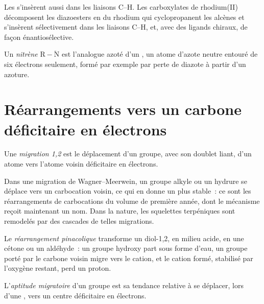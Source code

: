 Les  s'insèrent aussi dans les liaisons C--H. Les
carboxylates de rhodium(II) décomposent les diazoesters en  du
rhodium qui cyclopropanent les alcènes et s'insèrent sélectivement dans les
liaisons C--H, et, avec des ligands chiraux, de façon énantiosélective.

\begin{definition}[Nitrènes]\label{def:b3:radicals-carbenes:nitrene}
Un \emph{nitrène} $\mathrm{R{-}\ddot N}$ est l'analogue azoté d'un , un atome
d'azote neutre entouré de six électrons seulement, formé par exemple par
perte de diazote à partir d'un azoture.
\end{definition}

\section{Réarrangements vers un carbone déficitaire en électrons}

\begin{definition}[Migration 1,2]\label{def:b3:radicals-carbenes:shift}
Une \emph{migration 1,2} est le déplacement d'un
groupe, avec son doublet liant, d'un atome vers l'atome voisin déficitaire
en électrons.
\end{definition}

Dans une migration de Wagner--Meerwein, un groupe alkyle ou un hydrure se
déplace vers un carbocation voisin, ce qui en donne un plus stable~: ce sont
les réarrangements de carbocations du volume de première année, dont le
mécanisme reçoit maintenant un nom. Dans la nature, les squelettes
terpéniques sont remodelés par des cascades de telles migrations.

\begin{definition}\label{def:b3:radicals-carbenes:pinacol}
Le \emph{réarrangement pinacolique} transforme un
diol-1,2, en milieu acide, en une cétone ou un aldéhyde~: un groupe hydroxy
part sous forme d'eau, un groupe porté par le carbone voisin migre vers le
cation, et le cation formé, stabilisé par l'oxygène restant, perd un
proton.
\end{definition}

\begin{definition}\label{def:b3:radicals-carbenes:migratory}
L'\emph{aptitude migratoire} d'un groupe est sa
tendance relative à se déplacer, lors d'une , vers un centre
déficitaire en électrons.
\end{definition}

